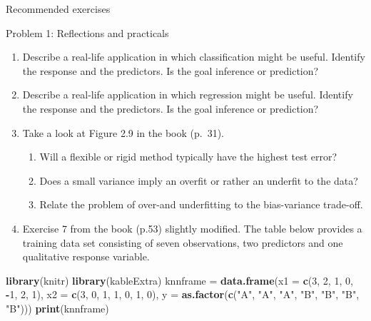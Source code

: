 \documentclass[ignorenonframetext,]{beamer}
\newenvironment{Shaded}{\begin{snugshade}}{\end{snugshade}}
\newcommand{\KeywordTok}[1]{\textcolor[rgb]{0.13,0.29,0.53}{\textbf{#1}}}
\newcommand{\DataTypeTok}[1]{\textcolor[rgb]{0.13,0.29,0.53}{#1}}
\newcommand{\DecValTok}[1]{\textcolor[rgb]{0.00,0.00,0.81}{#1}}
\newcommand{\StringTok}[1]{\textcolor[rgb]{0.31,0.60,0.02}{#1}}
\newcommand{\OperatorTok}[1]{\textcolor[rgb]{0.81,0.36,0.00}{\textbf{#1}}}
\newcommand{\NormalTok}[1]{#1}
\providecommand{\tightlist}{%
  \setlength{\itemsep}{0pt}\setlength{\parskip}{0pt}}
\begin{document}
\begin{frame}[fragile]{Recommended exercises}

\begin{block}{Problem 1: Reflections and practicals}

\begin{enumerate}
\def\labelenumi{\arabic{enumi}.}
\item
  Describe a real-life application in which classification might be
  useful. Identify the response and the predictors. Is the goal
  inference or prediction?
\item
  Describe a real-life application in which regression might be useful.
  Identify the response and the predictors. Is the goal inference or
  prediction?
\item
  Take a look at Figure 2.9 in the book (p.~31).

  \begin{enumerate}
  \def\labelenumii{\alph{enumii}.}
  \tightlist
  \item
    Will a flexible or rigid method typically have the highest test
    error?
  \item
    Does a small variance imply an overfit or rather an underfit to the
    data?
  \item
    Relate the problem of over-and underfitting to the bias-variance
    trade-off.
  \end{enumerate}
\item
  Exercise 7 from the book (p.53) slightly modified. The table below
  provides a training data set consisting of seven observations, two
  predictors and one qualitative response variable.
\end{enumerate}

\begin{Shaded}
\begin{Highlighting}[]
\KeywordTok{library}\NormalTok{(knitr)}
\KeywordTok{library}\NormalTok{(kableExtra)}
\NormalTok{knnframe =}\StringTok{ }\KeywordTok{data.frame}\NormalTok{(}\DataTypeTok{x1 =} \KeywordTok{c}\NormalTok{(}\DecValTok{3}\NormalTok{, }\DecValTok{2}\NormalTok{, }\DecValTok{1}\NormalTok{, }\DecValTok{0}\NormalTok{, }\OperatorTok{-}\DecValTok{1}\NormalTok{, }\DecValTok{2}\NormalTok{, }\DecValTok{1}\NormalTok{), }\DataTypeTok{x2 =} \KeywordTok{c}\NormalTok{(}\DecValTok{3}\NormalTok{, }\DecValTok{0}\NormalTok{, }\DecValTok{1}\NormalTok{, }\DecValTok{1}\NormalTok{, }
    \DecValTok{0}\NormalTok{, }\DecValTok{1}\NormalTok{, }\DecValTok{0}\NormalTok{), }\DataTypeTok{y =} \KeywordTok{as.factor}\NormalTok{(}\KeywordTok{c}\NormalTok{(}\StringTok{"A"}\NormalTok{, }\StringTok{"A"}\NormalTok{, }\StringTok{"A"}\NormalTok{, }\StringTok{"B"}\NormalTok{, }\StringTok{"B"}\NormalTok{, }\StringTok{"B"}\NormalTok{, }\StringTok{"B"}\NormalTok{)))}
\KeywordTok{print}\NormalTok{(knnframe)}
\end{Highlighting}
\end{Shaded}


\end{block}
\end{frame}
\end{document}
